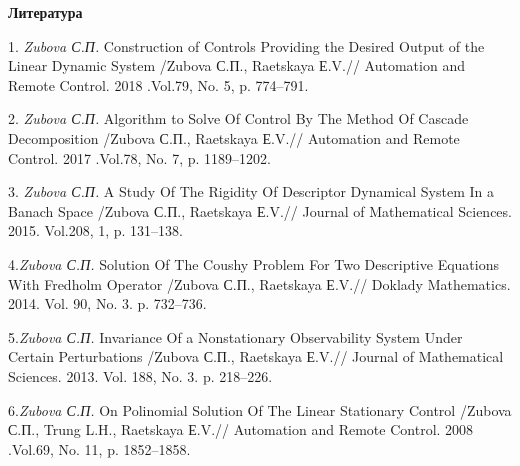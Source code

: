 \smallskip \centerline {\bf Литература} \nopagebreak


1. {\it  Zubova С.П.} Construction of Controls Providing the Desired Output of the Linear Dynamic System /Zubova С.П., Raetskaya Е.V.// Automation and Remote Control. 2018 .Vol.79, No. 5, p. 774--791.

2. {\it  Zubova С.П.}  Algorithm to Solve Of Control By The Method Of Cascade Decomposition /Zubova С.П., Raetskaya Е.V.// Automation and Remote Control. 2017 .Vol.78, No. 7, p. 1189--1202.

3. {\it  Zubova С.П.} A Study Of The Rigidity Of Descriptor Dynamical System In a Banach Space /Zubova С.П., Raetskaya Е.V.// Journal of Mathematical Sciences. 2015. Vol.208, 1, p. 131--138.


4.{\it  Zubova С.П.} Solution Of The Coushy Problem For Two Descriptive Equations With Fredholm Operator /Zubova С.П., Raetskaya Е.V.//
Doklady Mathematics. 2014.  Vol. 90, No. 3.  p. 732--736.

5.{\it  Zubova С.П.}  Invariance Of a Nonstationary  Observability System Under Certain Perturbations /Zubova С.П., Raetskaya Е.V.// Journal of Mathematical Sciences. 2013.  Vol.  188, No. 3. p. 218--226.

6.{\it  Zubova С.П.} On Polinomial  Solution Of The Linear Stationary Control /Zubova С.П., Trung L.H., Raetskaya Е.V.// Automation and Remote Control. 2008 .Vol.69, No. 11, p. 1852--1858.
